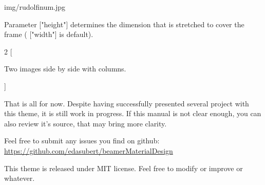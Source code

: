 \documentclass[aspectratio=43]{beamer}
\begin{document}
\begin{frameImg}[height]{img/rudolfinum.jpg}
\vspace*{60mm}
\begin{cardTiny}
Parameter {\color{primary} ["height"]} determines the dimension that is stretched to cover the frame ({\color{primary} ["width"]} is default).
\end{cardTiny}
\end{frameImg}

\begin{frame}
\begin{multicols}{2}
[
\begin{cardTiny}
Two images side by side with columns.
\end{cardTiny}
]
\centering
{}

\end{multicols}
\end{frame}

\begin{frame}
\begin{card}
That is all for now. Despite having successfully presented several project with this theme, it is still work in progress. If this manual is not clear enough, you can also review it's source, that may bring more clarity.
\end{card}
\begin{card}
Feel free to submit any issues you find on github: \\
{\footnotesize \url{https://github.com/edasubert/beamerMaterialDesign}}
\end{card}
\begin{card}
This theme is released under MIT license. Feel free to modify or improve or whatever. 
\end{card}
\end{frame}
\end{document}
